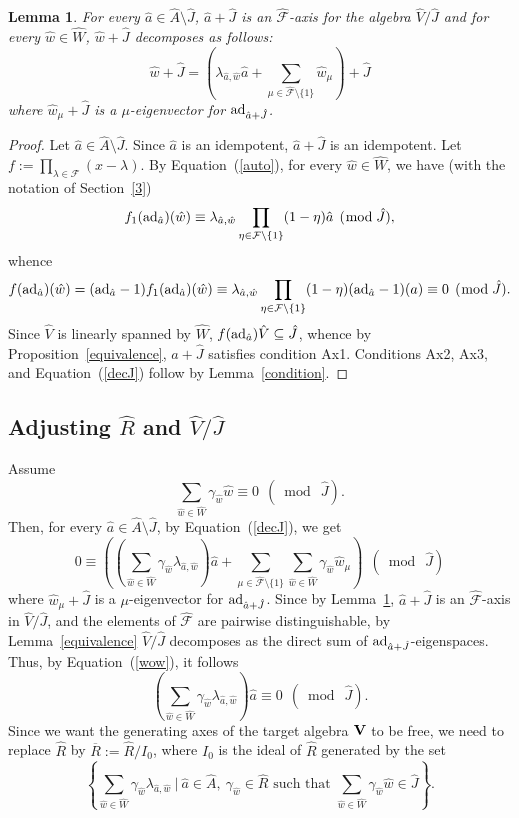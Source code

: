 \documentclass[a4paper]{amsart}
\newtheorem{lemma}{Lemma}[section]
\newcommand{\A}{ {\hat A}}
\newcommand{\Ro}{{\overline R}}
\newcommand{\Vo}{{\bf V}}
\newcommand{\ad}{{\rm ad}}
\newcommand{\aV}{{\hat V}}
\newcommand{\aR}{{\hat R}}
\newcommand{\hW}{{\hat W}}
\newcommand{\hJ}{{\hat J}}
\newcommand{\ha}{{\hat a}}
\newcommand{\hw}{{\hat w}}
\begin{document}
\begin{lemma}\label{wp}
 For every $\ha\in \A\setminus \hJ$, $\ha+\hJ$ is an $\hat{\mathcal F}$-axis for the algebra $\hat{V}/\hJ$ and for every $\hw\in \hW$, $\hw+\hJ$ decomposes as follows:
 \begin{equation}\label{decJ}
\hw+\hJ=(\lambda_{\ha,\hw}\ha+\sum_{\mu\in \hat{\mathcal F}\setminus \{1\}}\hw_\mu)+\hJ
\end{equation}
where $ \hw_\mu+\hJ$ is a $\mu$-eigenvector for $\ad_{\ha+\hJ}$.
\end{lemma}
\begin{proof}
 Let $\ha\in \A\setminus \hJ$. Since $\ha$ is an idempotent, $\ha+\hJ$ is an idempotent. Let $f:=\prod_{\lambda \in \mathcal F}(x-\lambda)$. By Equation~(\ref{auto}), for every $\hw\in \hat W$, we have (with the notation of Section~\ref{3})
$$
f_1(\ad_\ha)(\hw)\equiv \lambda_{\ha, \hw}\prod_{\eta\in \mathcal F\setminus \{1\}}(1-\eta)\ha \:\:(\bmod \:\hJ),
$$
whence
$$
f(\ad_\ha)(\hw)= (\ad_\ha-1)f_1(\ad_\ha)(\hw)\equiv \lambda_{\ha, \hw}\prod_{\eta\in \mathcal F\setminus \{1\}}(1-\eta)(\ad_\ha-1)(a)\equiv 0 \:\: (\bmod \:\hJ).
$$
Since $\hat V$ is linearly spanned by $\hat W$, $f(\ad_\ha)\hat V\subseteq \hJ$, whence by Proposition~\ref{equivalence}, $\ha+\hJ$ satisfies condition Ax1. Conditions Ax2, Ax3, and Equation~(\ref{decJ}) follow by Lemma~\ref{condition}.
\end{proof}

\subsection{Adjusting  $\aR$ and $\aV/\hJ$}
Assume 
$$
\sum_{\hw\in \hW} \gamma_\hw \hw\equiv 0 \:\:(\bmod \:\hJ).
$$   
Then, for every $\ha \in \A \setminus \hJ$, by Equation~(\ref{decJ}), we get 
\begin{equation}\label{wow}
0\equiv \left ((\sum_{\hw\in \hW} \gamma_\hw \lambda_{\ha,\hw})\ha+\sum_{\mu\in \hat{\mathcal F}\setminus \{1\}}\sum_{\hw\in \hW} \gamma_\hw \hw_\mu\right )\:\:(\bmod \:\hJ)
\end{equation}
where $\hw_\mu+\hJ$ is a $\mu$-eigenvector for $\ad_{\ha+\hJ}$. Since by Lemma~\ref{wp}, $\ha+\hJ$ is an $\hat{\mathcal F}$-axis in $\hat V/\hJ$, and the elements  of $\hat{\mathcal F}$ are pairwise distinguishable, by Lemma~\ref{equivalence} $\hat V/\hJ$ decomposes as the direct sum of $\ad_{\ha+\hJ}$-eigenspaces. Thus, by Equation~(\ref{wow}), it follows 
$$
(\sum_{\hw\in \hW} \gamma_\hw \lambda_{\ha,\hw})\ha\equiv 0 \:\:(\bmod\:\hJ).
$$
Since we want the generating axes of the target algebra $\Vo$ to be free, we need to replace $\aR$ by $\Ro:=\aR/I_0$, where 
$I_0$ is the ideal of $\aR$ generated by the set
\begin{equation}\label{I0}
\left \{\sum_{\hw\in \hW}\gamma_\hw \lambda_{\ha,\hw}\:|\:\ha\in \A,\: \gamma_\hw\in \hat R \mbox{ such that }\sum_{\hw\in \hW}\gamma_\hw \hw\in  \hJ \right \}.
\end{equation}
\end{document}

